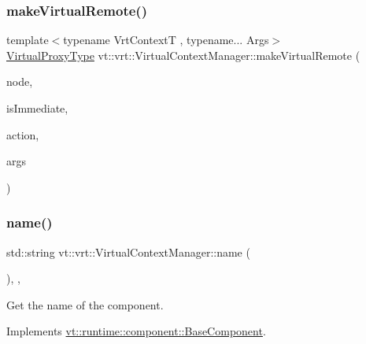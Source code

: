 \subsubsection{\texorpdfstring{make\+Virtual\+Remote()}{makeVirtualRemote()}}
{\footnotesize\ttfamily template$<$typename Vrt\+ContextT , typename... Args$>$ \\
\hyperlink{namespacevt_a1b417dd5d684f045bb58a0ede70045ac}{Virtual\+Proxy\+Type} vt\+::vrt\+::\+Virtual\+Context\+Manager\+::make\+Virtual\+Remote (\begin{DoxyParamCaption}\item[{\hyperlink{namespacevt_a866da9d0efc19c0a1ce79e9e492f47e2}{Node\+Type} const \&}]{node,  }\item[{bool}]{is\+Immediate,  }\item[{\hyperlink{namespacevt_a102aa105d64254d89f7e585d106c95aa}{Action\+Proxy\+Type}}]{action,  }\item[{Args \&\&...}]{args }\end{DoxyParamCaption})\hspace{0.3cm}{\ttfamily [private]}}

\mbox{\label{structvt_1_1vrt_1_1_virtual_context_manager_a56636a2609d203ef7eb3230af13ef7df}} 
\subsubsection{\texorpdfstring{name()}{name()}}
{\footnotesize\ttfamily std\+::string vt\+::vrt\+::\+Virtual\+Context\+Manager\+::name (\begin{DoxyParamCaption}{ }\end{DoxyParamCaption})\hspace{0.3cm}{\ttfamily [inline]}, {\ttfamily [override]}, {\ttfamily [virtual]}}



Get the name of the component. 



Implements \hyperlink{structvt_1_1runtime_1_1component_1_1_base_component_a7701485f3539f78d42e6bad47fc7eb78}{vt\+::runtime\+::component\+::\+Base\+Component}.

\mbox{\label{structvt_1_1vrt_1_1_virtual_context_manager_ab79342508fe36427b54e3d94297e223a}} 
